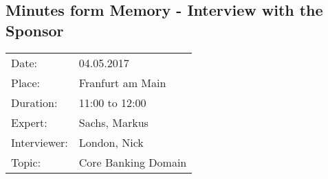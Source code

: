 \subsection*{Minutes form Memory  - Interview with the Sponsor}
\begin{tabular}{l l}
Date: & 04.05.2017 \\
Place: & Franfurt am Main \\
Duration: & 11:00 to 12:00 \\
Expert: & Sachs, Markus \\
Interviewer: & London, Nick \\
Topic: & Core Banking Domain
\end{tabular}

\paragraph{}

